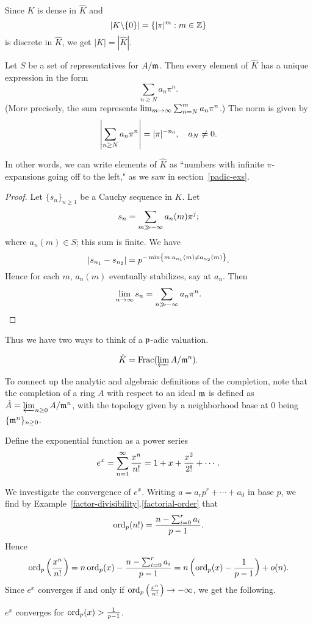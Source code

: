 Since $K$ is dense in $\hat K$ and 
\[|K\backslash\{0\}|=\left\{{|\pi|^m}:{m\in \mathbb{Z}}\right\}\]
is discrete in $\hat K$, we get $|K|=|\hat K|$.

\begin{pr}
Let $S$ be a set of representatives for $A/\mathfrak{m}$. Then every element of $\hat K$ has a unique expression in the form
\[
\sum_{n\ge N} a_n \pi^n.
\]
(More precisely, the sum represents $\lim_{m\to \infty}\sum_{n=N}^{m}a_n\pi^n$.) 
The norm is given by
\[
\left| {\sum_{n\ge N} a_n \pi^n} \right|=|\pi|^{-n_0},\quad a_{N}\ne0.
\]
\end{pr}
In other words, we can write elements of $\hat{K}$ as ``numbers with infinite $\pi$-expansions going off to the left," as we saw in section~\ref{padic-exs}.
\begin{proof}
Let $\{s_n\}_{n\ge 1}$ be a Cauchy sequence in $K$. Let
\[
s_n=\sum_{m\gg -\infty} a_n(m)\pi^j;
\]
where $a_n(m)\in S$; this sum is finite. We have
\[
|s_{n_1}-s_{n_2}|=p^{-\min\left\{{m}:{a_{n_1}(m)\ne a_{n_2}(m)}\right\}}.
\]
Hence for each $m$, $a_n(m)$ eventually stabilizes, say at $a_n$. Then
\[
\lim_{n\to \infty} s_n=\sum_{n\gg -\infty} a_n\pi^n.
\]
\end{proof}
Thus we have two ways to think of a $\mathfrak{p}$-adic valuation.
\begin{pr}
\[
\hat{K}=\operatorname{Frac}(\varprojlim A/\mathfrak{m}^n).
\]
\end{pr}
To connect up the analytic and algebraic definitions of the completion, note that the completion of a ring $A$ with respect to an ideal $\mathfrak{m}$ is defined as $\hat{A}=\varprojlim_{n\ge 0} A/\mathfrak{m}^n$, with the topology given by a neighborhood base at 0 being $\{\mathfrak{m}^n\}_{n\ge 0}$.
\begin{df}
Define the exponential function as a power series
\[
e^x=\sum_{n=1}^{\infty} \frac{x^n}{n!}=1+x+\frac{x^2}{2!}+\cdots.
\]
\end{df}
We investigate the convergence of $e^x$. Writing $a=a_rp^r+\cdots +a_0$ in base $p$, we find by Example~\ref{factor-divisibility}.\ref{factorial-order} that
\[
\operatorname{ord}_p(n!)=\frac{n-\sum_{i=0}^r a_i}{p-1}.
\]
Hence 
\[\operatorname{ord}_p\left( {\frac{x^n}{n!}} \right)=n\operatorname{ord}_p(x)-\frac{n-\sum_{i=0}^r a_i}{p-1}=n\left( {\operatorname{ord}_p(x)-\frac{1}{p-1}} \right)+o(n).\]
Since $e^x$ converges if and only if $\operatorname{ord}_p\left( {\frac{x^n}{n!}} \right)\to -\infty$, we get the following.
\begin{pr}
$e^x$ converges for $\operatorname{ord}_p(x)>\frac{1}{p-1}$.
\end{pr}

